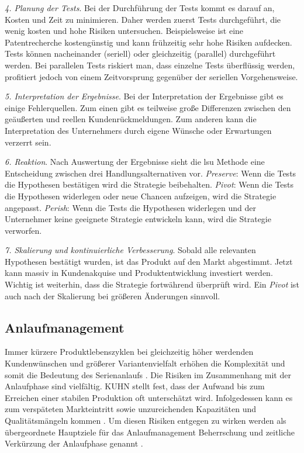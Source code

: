 \textit{4. Planung der Tests}. Bei der Durchführung der Tests kommt es darauf an, Kosten und Zeit zu minimieren. Daher werden zuerst Tests durchgeführt, die wenig kosten und hohe Risiken untersuchen. Beispielsweise ist eine Patentrecherche kostengünstig und kann frühzeitig sehr hohe Risiken aufdecken. Tests können nacheinander (seriell) oder gleichzeitig (parallel) durchgeführt werden. Bei parallelen Tests riskiert man, dass einzelne Tests überflüssig werden, profitiert jedoch von einem Zeitvorsprung gegenüber der seriellen Vorgehensweise. 

\textit{5. Interpretation der Ergebnisse}. Bei der Interpretation der Ergebnisse gibt es einige Fehlerquellen. Zum einen gibt es teilweise große Differenzen zwischen den geäußerten und reellen Kundenrückmeldungen. Zum anderen kann die Interpretation des Unternehmers durch eigene Wünsche oder Erwartungen verzerrt sein.

\textit{6. Reaktion}. Nach Auswertung der Ergebnisse sieht die \gls{lsu} Methode eine Entscheidung zwischen drei Handlungsalternativen vor. \textit{Preserve}: Wenn die Tests die Hypothesen bestätigen wird die Strategie beibehalten. \textit{Pivot}: Wenn die Tests die Hypothesen widerlegen oder neue Chancen aufzeigen, wird die Strategie angepasst. \textit{Perish}: Wenn die Tests die Hypothesen widerlegen und der Unternehmer keine geeignete Strategie entwickeln kann, wird die Strategie verworfen. 

\textit{7. Skalierung und kontinuierliche Verbesserung}. Sobald alle relevanten Hypothesen bestätigt wurden, ist das Produkt auf den Markt abgestimmt. Jetzt kann massiv in Kundenakquise und Produktentwicklung investiert werden. Wichtig ist weiterhin, dass die Strategie fortwährend überprüft wird. Ein \textit{Pivot} ist auch nach der Skalierung bei größeren Änderungen sinnvoll. 


\subsection{Anlaufmanagement}
Immer kürzere Produktlebenszyklen bei gleichzeitig höher werdenden Kundenwünschen und größerer Variantenvielfalt erhöhen die Komplexität und somit die Bedeutung des Serienanlaufs \cite{Kuhn2002,Schuh2004}. Die Risiken im Zusammenhang mit der Anlaufphase sind vielfältig. KUHN %
stellt fest, dass der Aufwand bis zum Erreichen einer stabilen Produktion oft unterschätzt wird. Infolgedessen kann es zum verspäteten Markteintritt sowie unzureichenden Kapazitäten und Qualitätsmängeln kommen \cite{Kuhn2002}. Um diesen Risiken entgegen zu wirken werden als übergeordnete Hauptziele für das Anlaufmanagement Beherrschung und zeitliche Verkürzung der Anlaufphase genannt \cite{Kuhn2002, Schmitt2015}. 

